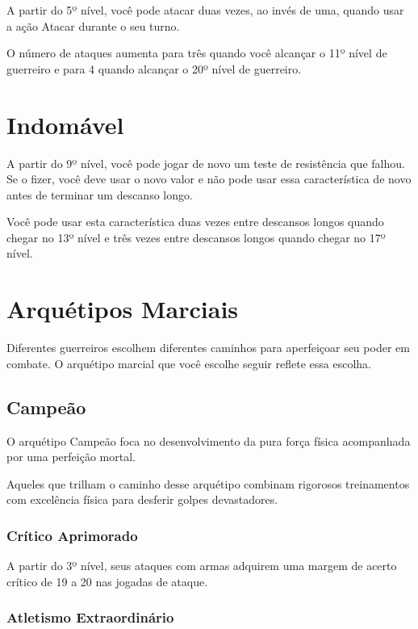 \begin{multicols}{2}
A partir do 5º nível, você pode atacar duas vezes, ao invés de uma, quando usar
a ação Atacar durante o seu turno.

O número de ataques aumenta para três quando você alcançar o 11º nível de
guerreiro e para 4 quando alcançar o 20º nível de guerreiro.

\section*{Indomável}%

A partir do 9º nível, você pode jogar de novo um teste de resistência que
falhou. Se o fizer, você deve usar o novo valor e não pode usar essa
característica de novo antes de terminar um descanso longo.

Você pode usar esta característica duas vezes entre descansos longos quando
chegar no 13º nível e três vezes entre descansos longos quando chegar no 17º
nível.

\section*{Arquétipos Marciais}%

Diferentes guerreiros escolhem diferentes caminhos para aperfeiçoar seu poder em
combate. O arquétipo marcial que você escolhe seguir reflete essa escolha.

\subsection*{Campeão}%

O arquétipo Campeão foca no desenvolvimento da pura força física acompanhada por
uma perfeição mortal.

Aqueles que trilham o caminho desse arquétipo combinam rigorosos treinamentos
com excelência física para desferir golpes devastadores.

\subsubsection{Crítico Aprimorado}%

A partir do 3º nível, seus ataques com armas adquirem uma margem de acerto
crítico de 19 a 20 nas jogadas de ataque.

\subsubsection{Atletismo Extraordinário}%


\end{multicols}

